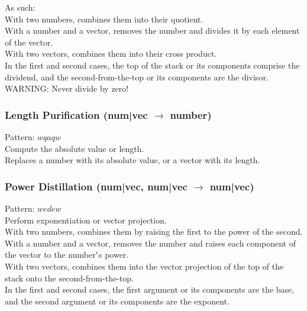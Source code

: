 \documentclass[12pt]{article}
\begin{document}
  
    As such:\\With two numbers, combines them into their quotient.\\With a number and a vector, removes the number and divides it by each element of the vector.\\With two vectors, combines them into their cross product.\\In the first and second cases, the top of the stack or its components comprise the dividend, and the second-from-the-top or its components are the divisor.\\WARNING: Never divide by zero!\\


  \label{sec: patterns/math@hexcasting:abs}
\subsubsection*{Length Purification (num|vec $\rightarrow$ number)}

    Pattern: $wqaqw$\\
      Compute the absolute value or length.\\


  
    Replaces a number with its absolute value, or a vector with its length.\\


  \label{sec: patterns/math@hexcasting:pow}
\subsubsection*{Power Distillation (num|vec, num|vec $\rightarrow$ num|vec)}

    Pattern: $wedew$\\
      Perform exponentiation or vector projection.\\


  
    With two numbers, combines them by raising the first to the power of the second.\\With a number and a vector, removes the number and raises each component of the vector to the number$\rq$s power.\\With two vectors, combines them into the vector projection of the top of the stack onto the second-from-the-top.\\In the first and second cases, the first argument or its components are the base, and the second argument or its components are the exponent.\\
\end{document}
